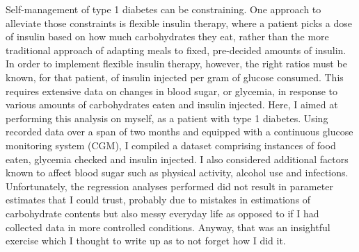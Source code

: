 Self-management of type 1 diabetes can be constraining.
One approach to alleviate those constraints is flexible insulin therapy, where a patient picks a dose of insulin based on how much carbohydrates they eat, rather than the more traditional approach of adapting meals to fixed, pre-decided amounts of insulin.
In order to implement flexible insulin therapy, however, the right ratios must be known, for that patient, of insulin injected per gram of glucose consumed.
This requires extensive data on changes in blood sugar, or glycemia, in response to various amounts of carbohydrates eaten and insulin injected.
Here, I aimed at performing this analysis on myself, as a patient with type 1 diabetes.
Using recorded data over a span of two months and equipped with a continuous glucose monitoring system (CGM), I compiled a dataset comprising instances of food eaten, glycemia checked and insulin injected.
I also considered additional factors known to affect blood sugar such as physical activity, alcohol use and infections.
Unfortunately, the regression analyses performed did not result in parameter estimates that I could trust, probably due to mistakes in estimations of carbohydrate contents but also messy everyday life as opposed to if I had collected data in more controlled conditions.
Anyway, that was an insightful exercise which I thought to write up as to not forget how I did it.